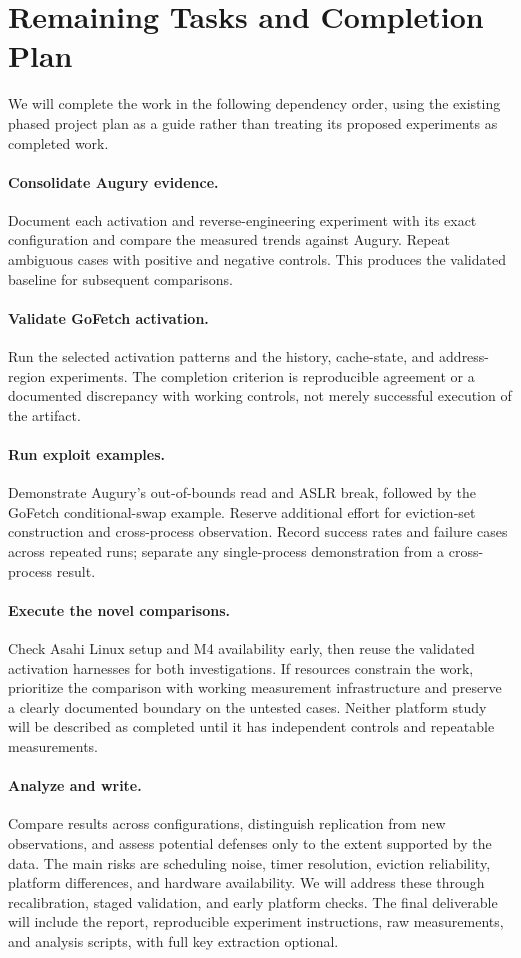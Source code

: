 \section{Remaining Tasks and Completion Plan}
We will complete the work in the following dependency order, using the existing phased project plan as a guide rather than treating its proposed experiments as completed work.

\paragraph{Consolidate Augury evidence.}
Document each activation and reverse-engineering experiment with its exact configuration and compare the measured trends against Augury. Repeat ambiguous cases with positive and negative controls. This produces the validated baseline for subsequent comparisons.

\paragraph{Validate GoFetch activation.}
Run the selected activation patterns and the history, cache-state, and address-region experiments. The completion criterion is reproducible agreement or a documented discrepancy with working controls, not merely successful execution of the artifact.

\paragraph{Run exploit examples.}
Demonstrate Augury's out-of-bounds read and ASLR break, followed by the GoFetch conditional-swap example. Reserve additional effort for eviction-set construction and cross-process observation. Record success rates and failure cases across repeated runs; separate any single-process demonstration from a cross-process result.

\paragraph{Execute the novel comparisons.}
Check Asahi Linux setup and M4 availability early, then reuse the validated activation harnesses for both investigations. If resources constrain the work, prioritize the comparison with working measurement infrastructure and preserve a clearly documented boundary on the untested cases. Neither platform study will be described as completed until it has independent controls and repeatable measurements.

\paragraph{Analyze and write.}
Compare results across configurations, distinguish replication from new observations, and assess potential defenses only to the extent supported by the data. The main risks are scheduling noise, timer resolution, eviction reliability, platform differences, and hardware availability. We will address these through recalibration, staged validation, and early platform checks. The final deliverable will include the report, reproducible experiment instructions, raw measurements, and analysis scripts, with full key extraction optional.

